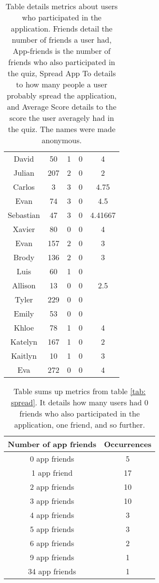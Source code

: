 \documentclass[preprint,12pt]{elsarticle}
\begin{document}
\begin{table}
\begin{tabular}{ c c c c c}
David & 50& 1& 0 & 4 \\
Julian & 207& 2& 0 & 2 \\
Carlos & 3& 3& 0 & 4.75 \\
Evan & 74& 3& 0 & 4.5 \\
Sebastian & 47& 3& 0 & 4.41667 \\
Xavier & 80& 0& 0 & 4 \\
Evan & 157& 2& 0 & 3 \\
Brody & 136& 2& 0 & 3 \\
Luis & 60& 1& 0 & \\
Allison & 13& 0& 0 & 2.5 \\
Tyler & 229& 0& 0 & \\
Emily & 53& 0& 0 & \\
Khloe & 78& 1& 0 & 4 \\
Katelyn & 167& 1& 0 & 2 \\
Kaitlyn & 10& 1& 0 & 3 \\
Eva & 272& 0& 0 & 4
\end{tabular}
\caption{Table details metrics about users who participated in the
  application. Friends detail the number of friends a user had,
  App-friends is the number of friends who also participated in the
  quiz, Spread App To details to how many people a user probably
  spread the application, and Average Score details to the score the
  user averagely had in the quiz. The names were made anonymous.}
\end{table}




 \begin{center}
 \begin{table}
 \label{tab:nospread}
 \begin{tabular}{ c c}
Number of app friends & Occurrences \\
\hline
0 app friends & 5 \\
1 app friend & 17 \\
2 app friends & 10 \\
3 app friends & 10 \\
4 app friends & 3 \\
5 app friends & 3\\
6 app friends & 2\\
9 app friends & 1\\
34 app friends & 1 \\
\end{tabular}
\caption{Table sums up metrics from table \ref{tab: spread}. It
  details how many users had 0 friends who also participated in the
  application, one friend, and so further.}
\end{table}
\end{center}
\end{document}
